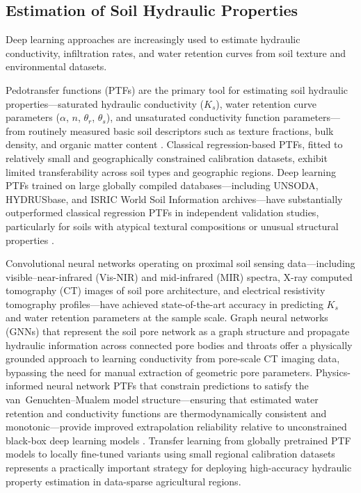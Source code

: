 \documentclass[land,article,submit,pdftex,moreauthors]{Definitions/mdpi}
\numberwithin{equation}{section}
\begin{document}
\normalsize

\subsection{Estimation of Soil Hydraulic Properties}

Deep learning approaches are increasingly used to estimate hydraulic conductivity, infiltration rates, and water retention curves from soil texture and environmental datasets.

Pedotransfer functions (PTFs) are the primary tool for estimating soil hydraulic properties---saturated hydraulic conductivity ($K_s$), water retention curve parameters ($\alpha$, $n$, $\theta_r$, $\theta_s$), and unsaturated conductivity function parameters---from routinely measured basic soil descriptors such as texture fractions, bulk density, and organic matter content \citep{wosten2001pedotransfer}. Classical regression-based PTFs, fitted to relatively small and geographically constrained calibration datasets, exhibit limited transferability across soil types and geographic regions. Deep learning PTFs trained on large globally compiled databases---including UNSODA, HYDRUSbase, and ISRIC World Soil Information archives---have substantially outperformed classical regression PTFs in independent validation studies, particularly for soils with atypical textural compositions or unusual structural properties \citep{zhang2018deep}.

Convolutional neural networks operating on proximal soil sensing data---including visible--near-infrared (Vis-NIR) and mid-infrared (MIR) spectra, X-ray computed tomography (CT) images of soil pore architecture, and electrical resistivity tomography profiles---have achieved state-of-the-art accuracy in predicting $K_s$ and water retention parameters at the sample scale. Graph neural networks (GNNs) that represent the soil pore network as a graph structure and propagate hydraulic information across connected pore bodies and throats offer a physically grounded approach to learning conductivity from pore-scale CT imaging data, bypassing the need for manual extraction of geometric pore parameters. Physics-informed neural network PTFs that constrain predictions to satisfy the van~Genuchten--Mualem model structure---ensuring that estimated water retention and conductivity functions are thermodynamically consistent and monotonic---provide improved extrapolation reliability relative to unconstrained black-box deep learning models \citep{karniadakis2021physics}. Transfer learning from globally pretrained PTF models to locally fine-tuned variants using small regional calibration datasets represents a practically important strategy for deploying high-accuracy hydraulic property estimation in data-sparse agricultural regions.
\end{document}
